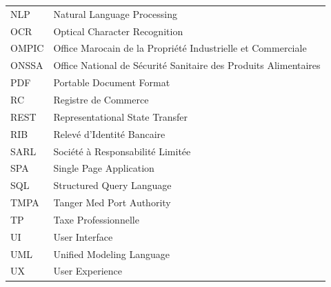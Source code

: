 \begin{longtable}{p{3cm} p{11cm}}
NLP    & Natural Language Processing \\
OCR    & Optical Character Recognition \\
OMPIC  & Office Marocain de la Propri\'{e}t\'{e} Industrielle et Commerciale \\
ONSSA  & Office National de S\'{e}curit\'{e} Sanitaire des Produits Alimentaires \\
PDF    & Portable Document Format \\
RC     & Registre de Commerce \\
REST   & Representational State Transfer \\
RIB    & Relev\'{e} d'Identit\'{e} Bancaire \\
SARL   & Soci\'{e}t\'{e} \`{a} Responsabilit\'{e} Limit\'{e}e \\
SPA    & Single Page Application \\
SQL    & Structured Query Language \\
TMPA   & Tanger Med Port Authority \\
TP     & Taxe Professionnelle \\
UI     & User Interface \\
UML    & Unified Modeling Language \\
UX     & User Experience \\

\bottomrule
\end{longtable}
